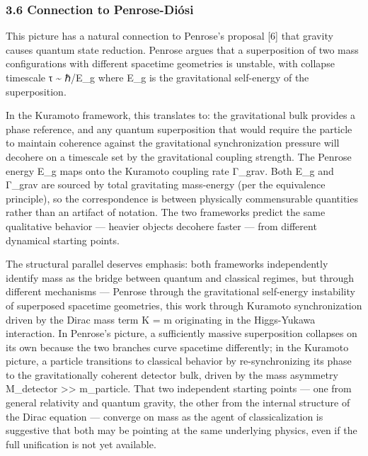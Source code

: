 \documentclass[
]{article}
\begin{document}
\subsubsection{3.6 Connection to
Penrose-Diósi}\label{connection-to-penrose-diuxf3si}

This picture has a natural connection to Penrose's proposal {[}6{]} that
gravity causes quantum state reduction. Penrose argues that a
superposition of two mass configurations with different spacetime
geometries is unstable, with collapse timescale τ \textasciitilde{}
ℏ/E\_g where E\_g is the gravitational self-energy of the superposition.

In the Kuramoto framework, this translates to: the gravitational bulk
provides a phase reference, and any quantum superposition that would
require the particle to maintain coherence against the gravitational
synchronization pressure will decohere on a timescale set by the
gravitational coupling strength. The Penrose energy E\_g maps onto the
Kuramoto coupling rate Γ\_grav. Both E\_g and Γ\_grav are sourced by
total gravitating mass-energy (per the equivalence principle), so the
correspondence is between physically commensurable quantities rather
than an artifact of notation. The two frameworks predict the same
qualitative behavior --- heavier objects decohere faster --- from
different dynamical starting points.

The structural parallel deserves emphasis: both frameworks independently
identify mass as the bridge between quantum and classical regimes, but
through different mechanisms --- Penrose through the gravitational
self-energy instability of superposed spacetime geometries, this work
through Kuramoto synchronization driven by the Dirac mass term K = m
originating in the Higgs-Yukawa interaction. In Penrose's picture, a
sufficiently massive superposition collapses on its own because the two
branches curve spacetime differently; in the Kuramoto picture, a
particle transitions to classical behavior by re-synchronizing its phase
to the gravitationally coherent detector bulk, driven by the mass
asymmetry M\_detector \textgreater\textgreater{} m\_particle. That two
independent starting points --- one from general relativity and quantum
gravity, the other from the internal structure of the Dirac equation ---
converge on mass as the agent of classicalization is suggestive that
both may be pointing at the same underlying physics, even if the full
unification is not yet available.
\end{document}
